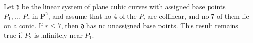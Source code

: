 Let $\mathfrak{d}$ be the linear system of plane cubic curves with assigned base points $P_1, \ldots, P_r$ in $\mathbf{P}^2$, and assume that no 4 of the $P_i$ are collinear, and no 7 of them lie on a conic. If $r \leqslant 7$, then $\mathfrak{d}$ has no unassigned base points. This result remains true if $P_2$ is infinitely near $P_1$.
